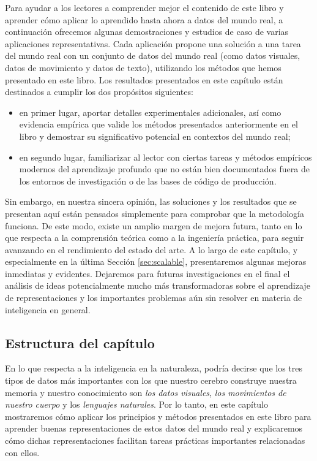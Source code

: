\documentclass[../../book-main_es.tex]{subfiles}
\begin{document}
Para ayudar a los lectores a comprender mejor el contenido de este libro y aprender 
cómo aplicar lo aprendido hasta ahora a datos del mundo real, a continuación ofrecemos algunas demostraciones y estudios de caso de
varias aplicaciones representativas. Cada aplicación propone una
solución a una tarea del mundo real con un conjunto de datos del mundo real (como
datos visuales, datos de movimiento y datos de texto), utilizando los métodos que hemos
presentado en este libro. Los resultados presentados en este capítulo
están destinados a cumplir los dos propósitos siguientes:
\begin{itemize}
    \item en primer lugar, aportar detalles experimentales adicionales, así como
        evidencia empírica que valide los métodos presentados
        anteriormente en el libro y demostrar su significativo
        potencial en contextos del mundo real;
    \item en segundo lugar, familiarizar al lector con ciertas tareas y
        métodos empíricos modernos del aprendizaje profundo que no están
        bien documentados fuera de los entornos de investigación o de las bases de código de producción.
\end{itemize}
Sin embargo, en nuestra sincera opinión, las soluciones y los resultados que se presentan
aquí están pensados simplemente para comprobar que la metodología funciona. De este
modo, existe un amplio margen de mejora futura, tanto en lo que respecta a la comprensión teórica como a la ingeniería práctica,
para seguir avanzando en el
rendimiento del estado del arte. A lo largo de este capítulo, y especialmente en la última Sección \ref{sec:scalable},
presentaremos algunas mejoras inmediatas y
evidentes. Dejaremos para futuras investigaciones en el  final el análisis de ideas potencialmente mucho más 
transformadoras sobre el aprendizaje de representaciones y los importantes problemas aún sin resolver en materia de inteligencia en general.

\subsection{Estructura del capítulo}
\label{sec:application_outline}
En lo que respecta a la inteligencia en la naturaleza, podría decirse que los tres tipos de datos más
importantes con los que nuestro cerebro construye nuestra memoria y
nuestro conocimiento son {\em los datos visuales}, {\em los movimientos de nuestro cuerpo} y los {\em lenguajes naturales}.
Por lo tanto, en este capítulo mostraremos cómo aplicar los principios y métodos presentados en este libro para aprender 
buenas representaciones de estos datos del mundo real y explicaremos cómo dichas representaciones facilitan tareas prácticas importantes relacionadas con ellos.
\end{document}
